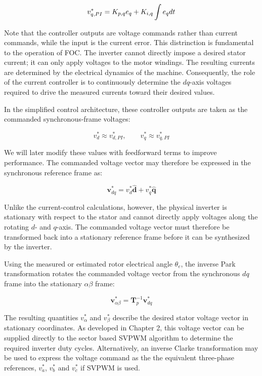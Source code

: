 \documentclass{article}
\begin{document}
\begin{equation}
    v_{q,PI}^* = K_{p,q}e_q + K_{i,q}\int e_q \space dt
\end{equation}

Note that the controller outputs are voltage commands rather than current commands, while the input is the current error. This distrinction is fundamental to the operation of FOC. The inverter cannot directly impose a desired stator current; it can only apply voltages to the motor windings. The resulting currents are determined by the electrical dynamics of the machine. Consequently, the role of the current controller is to continuously determine the $dq$-axis voltages required to drive the measured currents toward their desired values.

In the simplified control architecture, these controller outputs are taken as the commanded synchronous-frame voltages:

\begin{equation}
    v_d^* \approx v_{d,PI}^*, \qquad
    v_q^* \approx v_{q,PI}^*
\end{equation}

We will later modify these values with feedforward terms to improve performance. The commanded voltage vector may therefore be expressed in the synchronous reference frame as:

\begin{equation}
    \mathbf{v}_{dq}^* = v_d^*\hat{\mathbf{d}} + v_q^*\hat{\mathbf{q}}
\end{equation}

Unlike the current-control calculations, however, the physical inverter is stationary with respect to the stator and cannot directly apply voltages along the rotating $d$- and $q$-axis. The commanded voltage vector must therefore be transformed back into a stationary reference frame before it can be synthesized by the inverter.

Using the measured or estimated rotor electrical angle $\theta_e$, the inverse Park transformation rotates the commanded voltage vector from the synchronous $dq$ frame into the stationary $\alpha\beta$ frame:

\begin{equation}
    \mathbf{v}_{\alpha\beta}^* = \mathbf{T}_p^{-1}\mathbf{v}_{dq}^*
\end{equation}

The resulting quantities $v_\alpha^*$ and $v_\beta^*$ describe the desired stator voltage vector in stationary coordinates. As developed in Chapter 2, this voltage vector can be supplied directly to the sector based SVPWM algorithm to determine the required inverter duty cycles. Alternatively, an inverse Clarke transformation may be used to express the voltage command as the the equivalent three-phase references, $v_a^*$, $v_b^*$ and $v_c^*$ if SVPWM is used.
\end{document}
